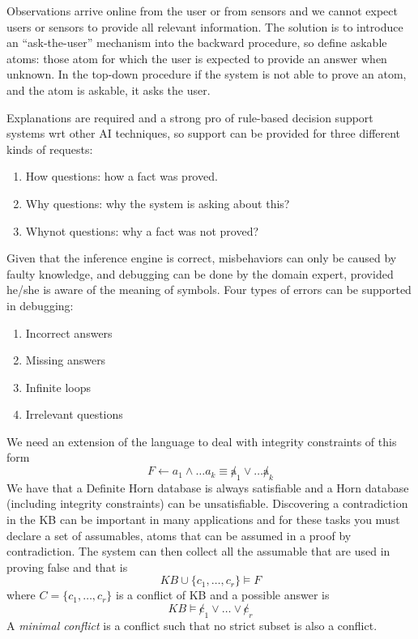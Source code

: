 Observations arrive online from the user or from sensors and we cannot expect users or
sensors to provide all relevant information.\newline
The solution is to introduce an “ask-the-user” mechanism into the backward procedure, so 
define askable atoms: those atom for which the user is expected to provide 
an answer when unknown.\newline
In the top-down procedure if the system is not able to prove an atom,
and the atom is askable, it asks the user.

Explanations are required and a strong pro of rule-based decision support systems wrt
other AI techniques, so support can be provided for three different kinds of requests:
\begin{enumerate}
   \item How questions: how a fact was proved.
   \item Why questions: why the system is asking about this?
   \item Whynot questions: why a fact was not proved?
\end{enumerate}
Given that the inference engine is correct, misbehaviors can only be caused by faulty
knowledge, and debugging can be done by the domain expert, provided he/she is aware of 
the meaning of symbols.\newline
Four types of errors can be supported in debugging:
\begin{enumerate}
   \item Incorrect answers
   \item Missing answers
   \item Infinite loops
   \item Irrelevant questions
\end{enumerate}
We need an extension of the language to deal with integrity constraints of this form
\[ F \gets a_1 \land \dots a_k \equiv \not a_1 \lor \dots \not a_k \]
We have that a Definite Horn database is always satisfiable and a Horn database
(including integrity constraints) can be unsatisfiable.\newline
Discovering a contradiction in the KB can be important in many applications and for these
tasks you must declare a set of assumables, atoms that can be assumed 
in a proof by contradiction.\newline
The system can then collect all the assumable that are used in proving false and that is
\[ KB \cup \{c_1, \dots, c_r\} \models F \]
where $C = \{c_1, \dots, c_r\}$ is a conflict of KB and a possible answer is 
\[ KB \models \not c_1 \lor \dots \lor \not c_r \]
A \emph{minimal conflict} is a conflict such that no strict subset is also a conflict.

